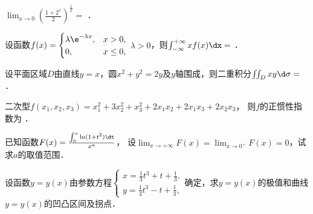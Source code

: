 \documentclass[plain,noanswer,medmath]{../../template/jnuexam}
\begin{document}










\begin{problem}
$\lim_{x \to 0} \left(\frac{1 + 2^x}{2} \right)^{\frac{1}{x}} =$ \fillin{}．
\end{problem}






\begin{problem}
设函数$f(x) = \begin{cases}
  \lambda \e^{- \lambda x}, & x > 0, \\
                         0, & x \le 0,
\end{cases}$ $\lambda > 0$，则$\int_{-\infty}^{+\infty} xf(x)\dx =$ \fillin{}．
\end{problem}


\begin{problem}
设平面区域$D$由直线$y = x$，圆$x^2 + y^2 = 2y$及$y$轴围成，则二重积分$\iint_D xy\d\sigma =$ \fillin{}．
\end{problem}


\begin{problem}
二次型$f(x_1,x_2,x_3) = x_{1}^{2} + 3x_2^2 + x_3^2 + 2x_1x_2 + 2x_1x_3 + 2x_2x_3$，
则$f$的正惯性指数为 \fillin{}．
\end{problem}




\begin{problem}[points=10]
已知函数$F(x) = \frac{\int_0^x \ln(1 + t^2)\dt}{x^a}$，
设$\!\!\lim_{x \to +\infty}\!\!\! F(x) = \!\lim_{x \to 0^+}\! F(x) = 0$，试求$a$的取值范围．
\end{problem}


\begin{problem}[points=11]
设函数$y = y(x)$由参数方程$\begin{cases}
  x = \frac{1}{3}t^3 + t + \frac{1}{3}, \\
  y = \frac{1}{3}t^3 - t + \frac{1}{3},
\end{cases}$确定，求$y = y(x)$的极值和曲线$y = y(x)$的凹凸区间及拐点．
\end{problem}
\end{document}

